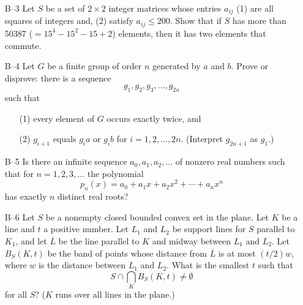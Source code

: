 \documentclass[amssymb,twocolumn,pra,10pt,aps]{revtex4-1}
\begin{document}
\begin{itemize}
\item[B--3] Let $S$ be a set of $2 \times 2$ integer matrices whose
entries $a_{ij}$ (1) are all squares of integers and, (2) satisfy $a_{ij}
\leq 200$. Show that if $S$ has more than 50387 ($= 15^4 - 15^2 - 15 +
2$) elements, then it has two elements that commute.

\item[B--4] Let $G$ be a finite group of order $n$ generated by $a$ and
$b$. Prove or disprove: there is a sequence
\[
g_1, g_2, g_3, \dots, g_{2n}
\]
such that
\begin{itemize}
   \item[(1)] every element of $G$ occurs exactly twice, and
   \item[(2)] $g_{i+1}$ equals $g_i a$ or $g_i b$ for $i = 1, 2, \dots,
   2n$. (Interpret $g_{2n+1}$ as $g_1$.)
\end{itemize}

\item[B--5] Is there an infinite sequence $a_0, a_1, a_2, \dots$ of
nonzero real numbers such that for $n = 1, 2, 3, \dots$ the polynomial
\[
p_n(x) = a_0 + a_1x + a_2x^2 + \cdots + a_nx^n
\]
has exactly $n$ distinct real roots?

\item[B--6] Let $S$ be a nonempty closed bounded convex set in the plane.
Let $K$ be a line and $t$ a positive number. Let $L_1$ and $L_2$ be
support lines for $S$ parallel to $K_1$, and let $\overline{L}$ be the
line parallel to $K$ and midway between $L_1$ and $L_2$. Let $B_S(K, t)$
be the band of points whose distance from $\overline{L}$ is at most
$(t/2)w$, where $w$ is the distance between $L_1$ and $L_2$. What is the
smallest $t$ such that
\[
S \cap \bigcap_K B_S(K, t) \neq \emptyset
\]
for all $S$? ($K$ runs over all lines in the plane.)

\end{itemize}
\end{document}
